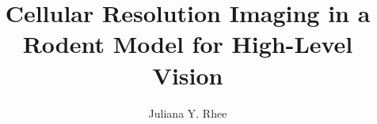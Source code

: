 \title{Cellular Resolution Imaging in a Rodent Model for High-Level Vision}
\author{Juliana Y. Rhee}



